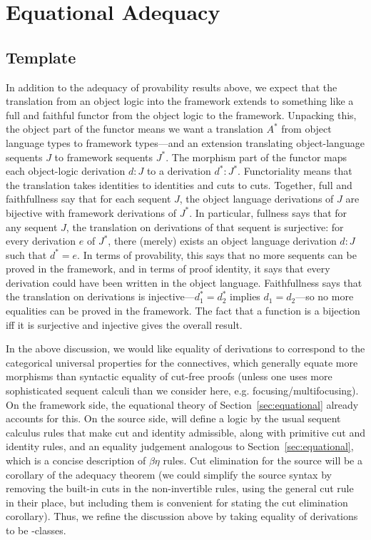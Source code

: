 \section{Equational Adequacy}
\label{sec:adequacy-equational}

\subsection{Template}

In addition to the adequacy of provability results above, we expect that
the translation from an object logic into the framework extends to
something like a full and faithful functor from the object logic to the
framework.  Unpacking this, the object part of the functor means we want
a translation $A^*$ from object language types to framework types---and
an extension translating object-language sequents $J$ to framework
sequents $J^*$.  The morphism part of the functor maps each object-logic
derivation $d : J$ to a derivation $d^* : J^*$.  Functoriality means
that the translation takes identities to identities and cuts to cuts.
Together, full and faithfullness say that for each sequent $J$, the
object language derivations of $J$ are bijective with framework
derivations of $J^*$.  In particular, fullness says that for any sequent
$J$, the translation on derivations of that sequent is surjective: for
every derivation $e$ of $J^*$, there (merely) exists an object language
derivation $d : J$ such that $d^* = e$.  In terms of provability, this
says that no more sequents can be proved in the framework, and in terms
of proof identity, it says that every derivation could have been written
in the object language. Faithfullness says that the translation on
derivations is injective---$d_1^* = d_2^*$ implies $d_1 = d_2$---so no
more equalities can be proved in the framework.  The fact that a
function is a bijection iff it is surjective and injective gives the
overall result.

In the above discussion, we would like equality of derivations to
correspond to the categorical universal properties for the connectives,
which generally equate more morphisms than syntactic equality of
cut-free proofs (unless one uses more sophisticated sequent calculi than
we consider here, e.g. focusing/multifocusing).  On the framework side,
the equational theory of Section~\ref{sec:equational} already accounts
for this.  On the source side, will define a logic by the usual sequent
calculus rules that make cut and identity admissible, along with
primitive cut and identity rules, and an equality judgement analogous to
Section~\ref{sec:equational}, which is a concise description of
$\beta\eta$ rules.  Cut elimination for the source will be a corollary
of the adequacy theorem (we could simplify the source syntax by removing
the built-in cuts in the non-invertible rules, using the general cut
rule in their place, but including them is convenient for stating the
cut elimination corollary).  Thus, we refine the discussion above by
taking equality of derivations to be \deq-classes.

